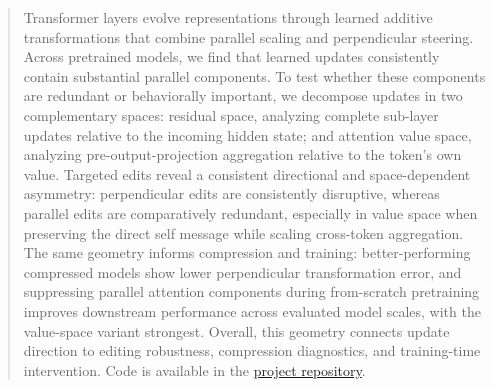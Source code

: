 \begin{abstract}
Transformer layers evolve representations through learned additive
transformations that combine parallel scaling and perpendicular steering.
Across pretrained models, we find that learned updates consistently contain
substantial parallel components. To test whether these components are
redundant or behaviorally important, we decompose updates in two complementary
spaces: residual space, analyzing complete sub-layer updates relative to the
incoming hidden state; and attention value space, analyzing
pre-output-projection aggregation relative to the token's own value. Targeted
edits reveal a consistent directional and space-dependent asymmetry:
perpendicular edits are consistently disruptive, whereas parallel edits are
comparatively redundant, especially in value space when preserving the direct
self message while scaling cross-token aggregation. The same geometry informs
compression and training: better-performing compressed models show lower
perpendicular transformation error, and suppressing parallel attention
components during from-scratch pretraining improves downstream performance across
evaluated model scales, with the value-space variant strongest. Overall, this geometry
connects update direction to editing robustness, compression diagnostics, and
training-time intervention. Code is available in the
\href{https://github.com/Shwai-He/Transformer-Geometry}{project repository}.
\end{abstract}

